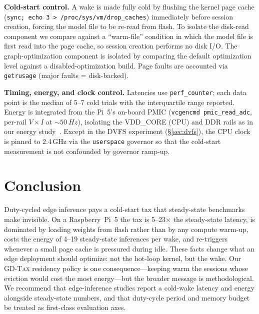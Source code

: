 \documentclass[journal]{IEEEtran}
\newcommand{\gdtax}{\textsc{GD-Tax}}
\begin{document}
\textbf{Cold-start control.} A wake is made fully cold by flushing the kernel page cache
(\texttt{sync; echo 3 > /proc/sys/vm/drop\_caches}) immediately before session creation, forcing
the model file to be re-read from flash. To isolate the disk-read component we compare against a
``warm-file'' condition in which the model file is first read into the page cache, so
session creation performs no disk I/O. The graph-optimization component is isolated by comparing
the default optimization level against a disabled-optimization build. Page faults are accounted
via \texttt{getrusage} (major faults = disk-backed).

\textbf{Timing, energy, and clock control.} Latencies use \texttt{perf\_counter}; each data
point is the median of 5--7 cold trials with the interquartile range reported. Energy is
integrated from the Pi~5's on-board PMIC (\texttt{vcgencmd pmic\_read\_adc}, per-rail
$V\!\times\!I$ at ${\sim}\SI{50}{Hz}$), isolating the VDD\_CORE (CPU) and DDR rails as in our
energy study~\cite{jacob2026energy}. Except in the DVFS experiment (\S\ref{sec:dvfs}), the CPU
clock is pinned to 2.4\,GHz via the \texttt{userspace} governor so that the cold-start
measurement is not confounded by governor ramp-up.



\section{Conclusion}\label{sec:conclusion}
Duty-cycled edge inference pays a cold-start tax that steady-state benchmarks make invisible.
On a Raspberry~Pi~5 the tax is 5--23$\times$ the steady-state latency, is dominated by loading
weights from flash rather than by any compute warm-up, costs the energy of 4--19 steady-state
inferences per wake, and re-triggers whenever a small page cache is pressured during idle. These
facts change what an edge deployment should optimize: not the hot-loop kernel, but the wake.
Our \gdtax{} residency policy is one consequence---keeping warm the sessions whose eviction would
cost the most energy---but the broader message is methodological. We recommend that edge-inference
studies report a cold-wake latency and energy alongside steady-state numbers, and that duty-cycle
period and memory budget be treated as first-class evaluation axes.



\end{document}
